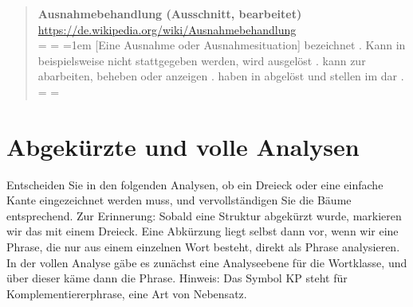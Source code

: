 \begin{quote}\onehalfspacing
   \textbf{Ausnahmebehandlung (Ausschnitt, bearbeitet)}\\
   {\footnotesize\url{https://de.wikipedia.org/wiki/Ausnahmebehandlung}}\\

  \newdimen\origiwspc%
  \newdimen\origiwstr%
  \origiwspc=\font
  \origiwstr=\font
  \font=1em
  {[Eine Ausnahme oder Ausnahmesituation]} bezeichnet   .
  Kann in  beispielsweise  nicht stattgegeben werden, wird  ausgelöst .
   kann zur   abarbeiten,   beheben oder anzeigen .
   haben in   abgelöst und stellen im   dar .
  \font=\origiwspc
  \font=\origiwstr
\end{quote}

\Halbzeile



\section{Abgekürzte und volle Analysen}

Entscheiden Sie in den folgenden Analysen, ob ein Dreieck oder eine einfache Kante eingezeichnet werden muss, und vervollständigen Sie die Bäume entsprechend.
Zur Erinnerung: Sobald eine Struktur abgekürzt wurde, markieren wir das mit einem Dreieck.
Eine Abkürzung liegt selbst dann vor, wenn wir eine Phrase, die nur aus einem einzelnen Wort besteht, direkt als Phrase analysieren.
In der vollen Analyse gäbe es zunächst eine Analyseebene für die Wortklasse, und über dieser käme dann die Phrase.
Hinweis: Das Symbol KP steht für Komplementiererphrase, eine Art von Nebensatz.

\Zeile

